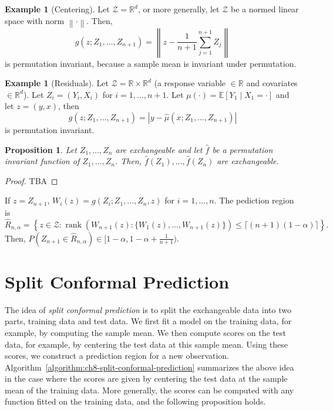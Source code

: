 \documentclass[a4paper,12pt]{article}
\numberwithin{equation}{section}
\theoremstyle{plain}
\newtheorem{proposition}[theorem]{Proposition}
\theoremstyle{definition}
\newtheorem{example}[theorem]{Example}
\theoremstyle{remark}
\begin{document}
\begin{example}[Centering]
    Let $\mathcal{Z}=\mathbb{R}^d$, or more generally, let $\mathcal{Z}$ be a normed linear space with norm $\left\|\cdot\right\|$. Then,
    \begin{equation}
        g(z;Z_1,\dots,Z_{n+1})=\left\|z-\frac{1}{n+1}\sum_{j=1}^{n+1}Z_j\right\|
    \end{equation}
    is permutation invariant, because a sample mean is invariant under permutation.
\end{example}

\begin{example}[Residuals]
    Let $\mathcal{Z}=\mathbb{R}\times \mathbb{R}^d$ (a response variable $\in\mathbb{R}$ and covariates $\in\mathbb{R}^d$). Let $Z_i=(Y_i,X_i)$ for $i=1,\dots,n+1$. Let $\mu(\cdot)=\mathbb{E}[Y_1\mid X_1=\cdot]$ and let $z=(y,x)$, then
    \begin{equation}
        g(z;Z_1,\dots,Z_{n+1})=\left|y-\hat{\mu}(x;Z_1,\dots,Z_{n+1})\right|
    \end{equation}
    is permutation invariant. 
\end{example}

\begin{proposition}
    Let $Z_1,\dots,Z_n$ are exchangeable and let $\hat{f}$ be a permutation invariant function of $Z_1,\dots,Z_n$. Then, $\hat{f}(Z_1),\dots,\hat{f}(Z_{n})$ are exchangeable.  
\end{proposition}

\begin{proof}
    TBA
\end{proof}

If $z=Z_{n+1}$, $W_i(z)=g(Z_i;Z_1,\dots,Z_n,z)$ for $i=1,\dots,n$. The pediction region is
\begin{equation}
    \hat{R}_{n,\alpha} = \left\{z\in\mathcal{Z}:\operatorname{rank}(W_{n+1}(z):\{W_1(z),...,W_{n+1}(z)\})\leq\lceil(n+1)(1-\alpha)\rceil\right\}. 
\end{equation}
Then, $P(Z_{n+1}\in\hat{R}_{n,\alpha})\in[1-\alpha,1-\alpha+\frac{1}{n+1})$. 

\section{Split Conformal Prediction}
The idea of \emph{split conformal prediction} is to split the exchangeable data into two parts, training data and test data. We first fit a model on the training data, for example, by computing the sample mean. We then compute scores on the test data, for example, by centering the test data at this sample mean. Using these scores, we construct a prediction region for a new observation. Algorithm~\ref{algorithm:ch8-split-conformal-prediction} summarizes the above idea in the case where the scores are given by centering the test data at the sample mean of the training data. More generally, the scores can be computed with any function fitted on the training data, and the following proposition holds.
\end{document}
